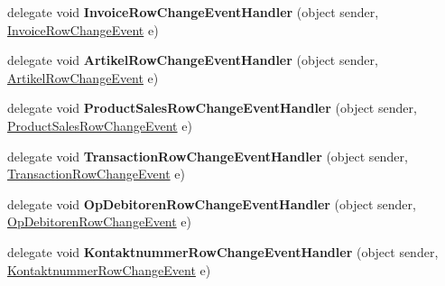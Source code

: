 \begin{DoxyCompactItemize}
\item 
delegate void {\bfseries Invoice\+Row\+Change\+Event\+Handler} (object sender, \hyperlink{class_products_1_1_data_1_1ds_sage_1_1_invoice_row_change_event}{Invoice\+Row\+Change\+Event} e)\hypertarget{class_products_1_1_data_1_1ds_sage_a3c4cb7cbf6cb53d789495624d0e80f79}{}\label{class_products_1_1_data_1_1ds_sage_a3c4cb7cbf6cb53d789495624d0e80f79}

\item 
delegate void {\bfseries Artikel\+Row\+Change\+Event\+Handler} (object sender, \hyperlink{class_products_1_1_data_1_1ds_sage_1_1_artikel_row_change_event}{Artikel\+Row\+Change\+Event} e)\hypertarget{class_products_1_1_data_1_1ds_sage_a8fee62ade1e9ac4078e4b2fba45438ed}{}\label{class_products_1_1_data_1_1ds_sage_a8fee62ade1e9ac4078e4b2fba45438ed}

\item 
delegate void {\bfseries Product\+Sales\+Row\+Change\+Event\+Handler} (object sender, \hyperlink{class_products_1_1_data_1_1ds_sage_1_1_product_sales_row_change_event}{Product\+Sales\+Row\+Change\+Event} e)\hypertarget{class_products_1_1_data_1_1ds_sage_aec79bc0800b29e5211ffc723a5982300}{}\label{class_products_1_1_data_1_1ds_sage_aec79bc0800b29e5211ffc723a5982300}

\item 
delegate void {\bfseries Transaction\+Row\+Change\+Event\+Handler} (object sender, \hyperlink{class_products_1_1_data_1_1ds_sage_1_1_transaction_row_change_event}{Transaction\+Row\+Change\+Event} e)\hypertarget{class_products_1_1_data_1_1ds_sage_ac188cb6c736d2b10e6b4cd8f4f1817f9}{}\label{class_products_1_1_data_1_1ds_sage_ac188cb6c736d2b10e6b4cd8f4f1817f9}

\item 
delegate void {\bfseries Op\+Debitoren\+Row\+Change\+Event\+Handler} (object sender, \hyperlink{class_products_1_1_data_1_1ds_sage_1_1_op_debitoren_row_change_event}{Op\+Debitoren\+Row\+Change\+Event} e)\hypertarget{class_products_1_1_data_1_1ds_sage_aac8b9976053b9abf4bdaf3fdb097d91d}{}\label{class_products_1_1_data_1_1ds_sage_aac8b9976053b9abf4bdaf3fdb097d91d}

\item 
delegate void {\bfseries Kontaktnummer\+Row\+Change\+Event\+Handler} (object sender, \hyperlink{class_products_1_1_data_1_1ds_sage_1_1_kontaktnummer_row_change_event}{Kontaktnummer\+Row\+Change\+Event} e)\hypertarget{class_products_1_1_data_1_1ds_sage_a3026467317bf8e6f49c09c5d0b84530e}{}\label{class_products_1_1_data_1_1ds_sage_a3026467317bf8e6f49c09c5d0b84530e}


\end{DoxyCompactItemize}

